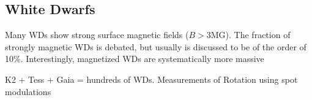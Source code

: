 {\color{red} \subsection{White Dwarfs}}
Many WDs show strong surface magnetic fields ($B>$3MG). The fraction of strongly magnetic WDs is debated, but usually is discussed to be of the order of 10\%. Interestingly, magnetized WDs are systematically more massive\cite{Ferrario_2015}  

K2 + Tess + Gaia = hundreds of WDs. Measurements of Rotation using spot modulations